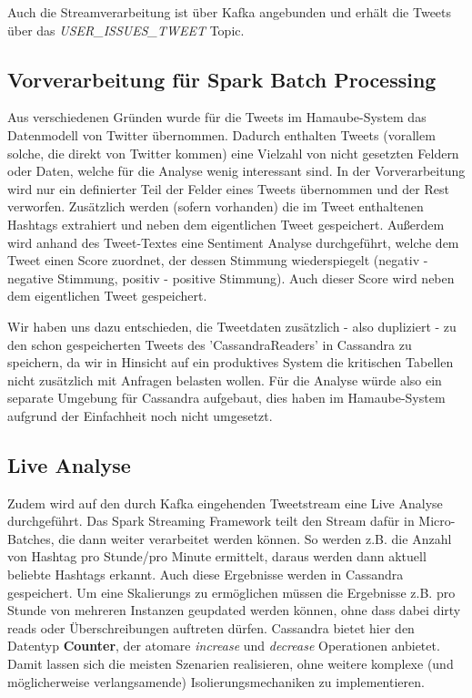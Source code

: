 Auch die Streamverarbeitung ist über Kafka angebunden und erhält die Tweets über das \textit{USER\_ISSUES\_TWEET} Topic.


\subsection*{Vorverarbeitung für Spark Batch Processing}
Aus verschiedenen Gründen wurde für die Tweets im Hamaube-System das Datenmodell von Twitter übernommen.
Dadurch enthalten Tweets (vorallem solche, die direkt von Twitter kommen) eine Vielzahl von nicht gesetzten Feldern oder Daten, welche für die Analyse wenig interessant sind.
In der Vorverarbeitung wird nur ein definierter Teil der Felder eines Tweets übernommen und der Rest verworfen.
Zusätzlich werden (sofern vorhanden) die im Tweet enthaltenen Hashtags extrahiert und neben dem eigentlichen Tweet gespeichert.
Außerdem wird anhand des Tweet-Textes eine Sentiment Analyse durchgeführt, welche dem Tweet einen Score zuordnet, der dessen Stimmung wiederspiegelt (negativ - negative Stimmung, positiv - positive Stimmung). Auch dieser Score wird neben dem eigentlichen Tweet gespeichert.

Wir haben uns dazu entschieden, die Tweetdaten zusätzlich - also dupliziert - zu den schon gespeicherten Tweets des 'CassandraReaders' in Cassandra zu speichern, da wir in Hinsicht auf ein produktives System die kritischen Tabellen nicht zusätzlich mit Anfragen belasten wollen.
Für die Analyse würde also ein separate Umgebung für Cassandra aufgebaut, dies haben im Hamaube-System aufgrund der Einfachheit noch nicht umgesetzt.

\subsection*{Live Analyse}
Zudem wird auf den durch Kafka eingehenden Tweetstream eine Live Analyse durchgeführt.
Das Spark Streaming Framework teilt den Stream dafür in Micro-Batches, die dann weiter verarbeitet werden können.
So werden z.B. die Anzahl von Hashtag pro Stunde/pro Minute ermittelt, daraus werden dann aktuell beliebte Hashtags erkannt.
Auch diese Ergebnisse werden in Cassandra gespeichert.
Um eine Skalierungs zu ermöglichen müssen die Ergebnisse z.B. pro Stunde von mehreren Instanzen geupdated werden können, ohne dass dabei dirty reads oder Überschreibungen auftreten dürfen. Cassandra bietet hier den Datentyp \textbf{Counter}, der atomare \textit{increase} und \textit{decrease} Operationen anbietet. Damit lassen sich die meisten Szenarien realisieren, ohne weitere  komplexe (und möglicherweise verlangsamende) Isolierungsmechaniken zu implementieren.

